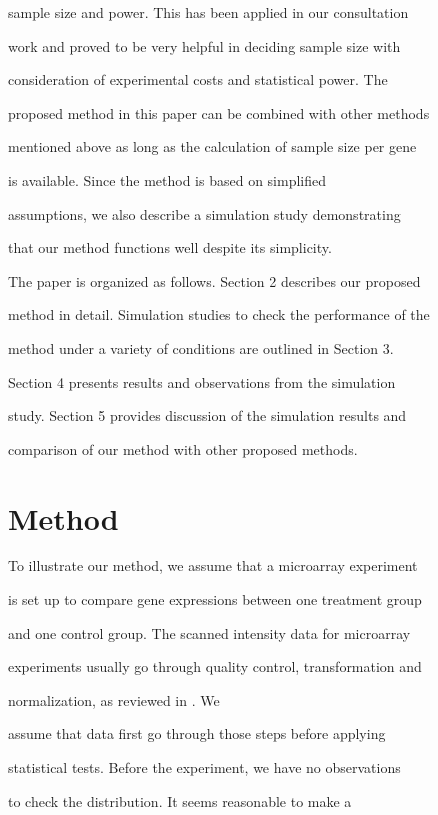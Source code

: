 \documentclass[12pt]{article}
\begin{document}
sample size and power.  This has been applied in our consultation

work and proved to be very helpful in deciding sample size with

consideration of experimental costs and statistical power.  The

proposed method in this paper can be combined with other methods

mentioned above as long as the calculation of sample size per gene

is available.  Since the method is based on simplified

assumptions, we also describe a simulation study demonstrating

that our method functions well despite its simplicity.



The paper is organized as follows. Section 2 describes our proposed

method in detail. Simulation studies to check the performance of the

method under a variety of conditions are outlined in Section 3.

Section 4 presents results and observations from the simulation

study.  Section 5 provides discussion of the simulation results and

comparison of our method with other proposed methods.



\section{Method}

To illustrate our method, we assume that a microarray experiment

is set up to compare gene expressions between one treatment group

and one control group.  The scanned intensity data for microarray

experiments usually go through quality control, transformation and

normalization, as reviewed in \citep{Smyth03, Quackenbush02}. We

assume that data first go through those steps before applying

statistical tests.  Before the experiment, we have no observations

to check the distribution.  It seems reasonable to make a
\end{document}
